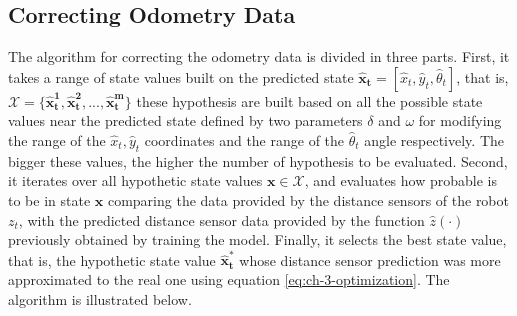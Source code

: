 \subsection{Correcting Odometry Data}\label{sec:ch-3:corr-odo-data}
The algorithm for correcting the odometry data is divided in three parts. First, it takes a range of state values built on the predicted state $\mathbf{\hat x_t} = [\hat x_t, \hat y_t, \hat \theta_t]$, that is, $\mathcal{X} = \{\mathbf{\hat x_t^1}, \mathbf{\hat x_t^2}, ..., \mathbf{\hat x_t^m}\}$ these hypothesis are built based on all the possible state values near the predicted state defined by two parameters $\delta$ and $\omega$ for modifying the range of the $\hat x_t, \hat y_t$ coordinates and the range of the $\hat \theta_t$ angle respectively. The bigger these values, the higher the number of hypothesis to be evaluated. Second, it iterates over all hypothetic state values $\mathbf{x} \in \mathcal{X}$, and evaluates how probable is to be in state $ \mathbf{x} $ comparing the data provided by the distance sensors of the robot $z_t$, with the predicted distance sensor data provided by the function $\hat z(\mathbf{\cdot})$ previously obtained by training the model. Finally, it selects the best state value, that is, the hypothetic state value $\mathbf{\hat x_t^*} $ whose distance sensor prediction was more approximated to the real one using equation \ref{eq:ch-3-optimization}. The algorithm is illustrated below.

